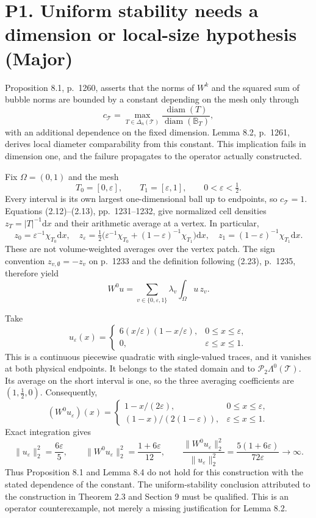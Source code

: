 \documentclass[10pt]{article}
\begin{document}
\section*{P1. Uniform stability needs a dimension or local-size hypothesis (Major)}
Proposition 8.1, p. 1260, asserts that the norms of \(W^k\) and the squared sum of bubble norms are bounded by a constant depending on the mesh only through \[c_{\mathcal T}=\max_{T\in\Delta_n(\mathcal T)}
\frac{\operatorname{diam}(T)}{\operatorname{diam}(\mathbb B_T)},\] with an additional dependence on the fixed dimension. Lemma 8.2, p. 1261, derives local diameter comparability from this constant. This implication fails in dimension one, and the failure propagates to the operator actually constructed.\par
Fix \(\Omega=(0,1)\) and the mesh \[T_0=[0,\varepsilon],\qquad T_1=[\varepsilon,1],
\qquad 0<\varepsilon<\tfrac12.\] Every interval is its own largest one-dimensional ball up to endpoints, so \(c_{\mathcal T}=1\). Equations (2.12)–(2.13), pp. 1231–1232, give normalized cell densities \(z_T=|T|^{-1}\mathrm dx\) and their arithmetic average at a vertex. In particular, \[z_0=\varepsilon^{-1}\chi_{T_0}\mathrm dx,\quad
z_\varepsilon=\tfrac12\bigl(\varepsilon^{-1}\chi_{T_0}
 +(1-\varepsilon)^{-1}\chi_{T_1}\bigr)\mathrm dx,\quad
z_1=(1-\varepsilon)^{-1}\chi_{T_1}\mathrm dx .\] These are not volume-weighted averages over the vertex patch. The sign convention \(z_{v,\emptyset}=-z_v\) on p. 1233 and the definition following (2.23), p. 1235, therefore yield \[W^0u=\sum_{v\in\{0,\varepsilon,1\}}\lambda_v\int_\Omega u\,z_v .\]\par
Take \[u_\varepsilon(x)=
\begin{cases}
6(x/\varepsilon)(1-x/\varepsilon),&0\le x\le\varepsilon,\\
0,&\varepsilon\le x\le1.
\end{cases}\] This is a continuous piecewise quadratic with single-valued traces, and it vanishes at both physical endpoints. It belongs to the stated domain and to \(\mathcal P_2\Lambda^0(\mathcal T)\). Its average on the short interval is one, so the three averaging coefficients are \((1,\tfrac12,0)\). Consequently, \[(W^0u_\varepsilon)(x)=
\begin{cases}
1-x/(2\varepsilon),&0\le x\le\varepsilon,\\
(1-x)/(2(1-\varepsilon)),&\varepsilon\le x\le1.
\end{cases}\] Exact integration gives \[\|u_\varepsilon\|_2^2=\frac{6\varepsilon}{5},
\qquad
\|W^0u_\varepsilon\|_2^2=\frac{1+6\varepsilon}{12},
\qquad
\frac{\|W^0u_\varepsilon\|_2^2}{\|u_\varepsilon\|_2^2}
=\frac{5(1+6\varepsilon)}{72\varepsilon}\longrightarrow\infty .\] Thus Proposition 8.1 and Lemma 8.4 do not hold for this construction with the stated dependence of the constant. The uniform-stability conclusion attributed to the construction in Theorem 2.3 and Section 9 must be qualified. This is an operator counterexample, not merely a missing justification for Lemma 8.2.\par
\end{document}
